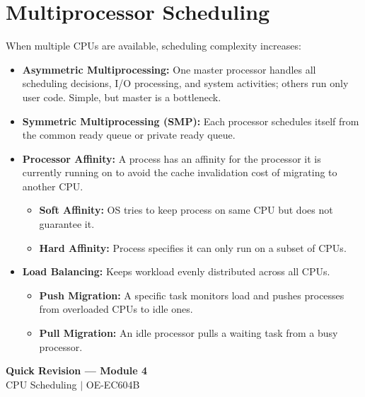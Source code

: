 \documentclass[12pt,a4paper]{article}
\begin{document}
\section{Multiprocessor Scheduling}

When multiple CPUs are available, scheduling complexity increases:
\begin{itemize}[leftmargin=*, itemsep=3pt]
  \item \textbf{Asymmetric Multiprocessing:} One master processor handles all scheduling decisions, I/O processing, and system activities; others run only user code. Simple, but master is a bottleneck.
  \item \textbf{Symmetric Multiprocessing (SMP):} Each processor schedules itself from the common ready queue or private ready queue.
  \item \textbf{Processor Affinity:} A process has an affinity for the processor it is currently running on to avoid the cache invalidation cost of migrating to another CPU.
  \begin{itemize}[leftmargin=*, itemsep=2.5pt, topsep=0pt]
    \item \textbf{Soft Affinity:} OS tries to keep process on same CPU but does not guarantee it.
    \item \textbf{Hard Affinity:} Process specifies it can only run on a subset of CPUs.
  \end{itemize}
  \item \textbf{Load Balancing:} Keeps workload evenly distributed across all CPUs.
  \begin{itemize}[leftmargin=*, itemsep=2.5pt, topsep=0pt]
    \item \textbf{Push Migration:} A specific task monitors load and pushes processes from overloaded CPUs to idle ones.
    \item \textbf{Pull Migration:} An idle processor pulls a waiting task from a busy processor.
    \end{itemize}
  \end{itemize}

\newpage
\begin{center}
  {\large\bfseries\color{myred} Quick Revision --- Module 4}\\[3pt]
  {\small\color{mydark} CPU Scheduling $|$ OE-EC604B}
\end{center}
\noindent{\color{myred}\rule{\linewidth}{1.2pt}}
\vspace{4pt}
\end{document}
